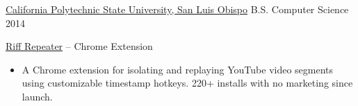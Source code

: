 \documentclass[10pt,a4paper]{article}
\begin{document}
\spacedhrule{0.5em}{-0.4em}


\headedsection
  {\href{https://www.calpoly.edu}{California Polytechnic State University, San Luis Obispo}}
  {} {%
  \headedsubsection
    {B.S. Computer Science}
    {2014}
    {\bodytext{}}
}

\spacedhrule{0.5em}{-0.4em}


\headedsection
  {\href{https://chromewebstore.google.com/detail/riff-repeater/jlllikemcgiipobbgjlledoojdlhhgjd}{Riff Repeater} -- Chrome Extension}
  {} {%
  \begin{itemize}
    \setlength{\itemsep}{0.4em}
    \item A Chrome extension for isolating and replaying YouTube video segments using customizable timestamp hotkeys. 220+ installs with no marketing since launch.
  \end{itemize}
}
\end{document}
